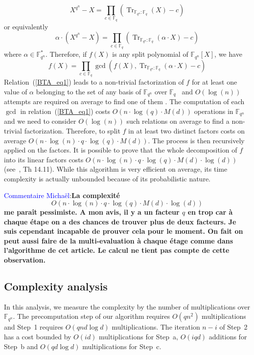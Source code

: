 \documentclass{sig-alternate}
\newcommand{\ff}[1]{\mathbb{F}_{#1}}
\newcommand{\fqn}{\ff{q^n}}
\newcommand{\basefsize}{q}
\newcommand{\extfdegree}{n}
\newcommand{\extfsize}{\basefsize^\extfdegree}
\newcommand{\basef}{\ff{\basefsize}}
\newcommand{\extf}{\ff{\extfsize}}
\DeclareMathOperator{\Tr}{Tr}
\newcommand{\trabs}[2]{\Tr_{#1:#2}}
\newcommand{\trextbase}{\trabs{\extf}{\basef}}
\newcommand{\bigO}{O}
\newcounter{algo}
\newcommand{\com }{\noindent \textcolor{blue}{Commentaire Micha\"el}:}
\begin{document}
$$X^{\extfsize}-X=\prod_{c \in \basef}   (\trextbase(X)-c)$$ 
or equivalently 
\begin{equation}
\label{BTA_eq0}
\alpha\cdot (X^{\extfsize}-X)=\prod_{c \in \basef}   (\trextbase(\alpha \cdot X)-c)
\end{equation}
where $\alpha \in \extf^\ast$. Therefore, if $f(X)$ is any split polynomial of $\extf[X]$, we have
\begin{equation}
\label{BTA_eq1}
f(X)=\prod_{c \in \basef} \gcd(f(X),\trextbase(\alpha \cdot X)-c)  
\end{equation}
Relation~(\ref{BTA_eq1}) leads to a non-trivial factorization of $f$ for at least one value of $\alpha$ 
belonging to the set of any basis of $\extf$ over $\basef$~\cite{berl70}  and $\bigO(\log(n))$ attempts are required on average to find one of them \cite{Menvanovans92}. The computation of each $\gcd$ in relation~(\ref{BTA_eq1}) costs $\bigO(n \cdot \log(q) \cdot M(d))$ operations in $\extf$ and we need to consider $\bigO(\log(n))$ such relations on average to find a non-trivial factorization. Therefore, 
 to split $f$ in at least two distinct factors costs on average $\bigO(n \cdot \log(n) \cdot  q \cdot \log(q) \cdot M(d))$. The process is then recursively applied on the factors. It is possible to prove that the whole decomposition of $f$ into its linear factors costs $\bigO(n  \cdot \log(n) \cdot q \cdot \log(q) \cdot M(d) \cdot \log(d))$ (see~\cite{Gathen2003}, Th 14.11). While this algorithm is very efficient on average, its time complexity is actually unbounded because of its probabilistic nature.
 

\begin{mycomment}
\com {\bf La complexit\'e 
$$\bigO(n  \cdot \log(n) \cdot q \cdot \log(q) \cdot M(d) \cdot \log(d))$$
me para\^it pessimiste. A mon avis, il y a un facteur $q$ en trop car \`a chaque \'etape on a des chances de trouver plus de deux facteurs. Je suis cependant incapable de prouver cela pour le moment. On fait on peut aussi faire de 
la multi-evaluation \`a chaque \'etage comme dans l'algorithme de cet article. Le calcul ne tient pas compte de cette observation.
}
\end{mycomment}




\subsection{Complexity analysis}

In this analysis, we measure the complexity by the number of multiplications over $\fqn$. 
%
The precomputation step of our algorithm requires $O(qn^2)$ multiplications and Step~1 requires $O(qnd\log d)$ multiplications. The iteration $n-i$ of Step~2 has a cost bounded by $O(id)$ multiplications for Step~a, $O(iqd)$ additions for Step~b and $O(qd\log d)$ multiplications for Step~c. 
\end{document}
